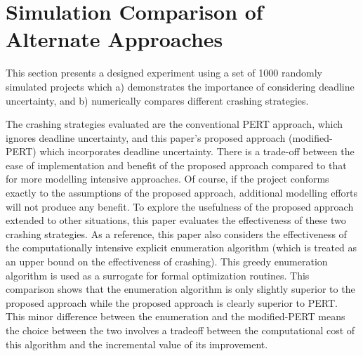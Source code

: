 \documentclass[11pt]{article}
\begin{document}
\section{Simulation Comparison of Alternate Approaches}
This section presents a designed experiment using a set of 1000 randomly simulated projects which a) demonstrates the importance of considering deadline uncertainty, and b) numerically compares different crashing strategies.

The crashing strategies evaluated are the conventional PERT approach, which ignores deadline uncertainty, and this paper's proposed approach (modified-PERT) which incorporates deadline uncertainty.
There is a trade-off between the ease of implementation and benefit of the proposed approach compared to that for more modelling intensive approaches.
Of course, if the project conforms exactly to the assumptions of the proposed approach, additional modelling efforts will not produce any benefit. 
To explore the usefulness of the proposed approach extended to other situations, this paper evaluates the effectiveness of these two crashing strategies.
As a reference, this paper also considers the effectiveness of the computationally intensive explicit enumeration algorithm (which is treated as an upper bound on the effectiveness of crashing). 
This greedy enumeration algorithm is used as a surrogate for formal optimization routines.
This comparison shows that the enumeration algorithm is only slightly superior to the proposed approach while the proposed approach is clearly superior to PERT. This minor difference between the enumeration and the modified-PERT means the choice between the two involves a tradeoff between the computational cost of this algorithm and the incremental value of its improvement.
\par
\end{document}
